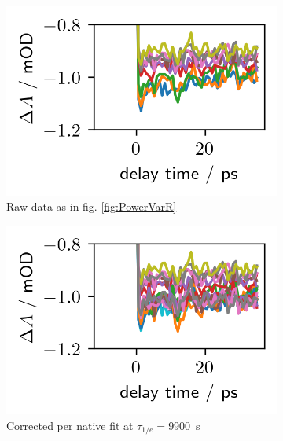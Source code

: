 \documentclass[twoside,openright,listof=numbered]{scrreprt}
\begin{document}
\begin{figure}[hbtp]
\centering
\begin{subfigure}[t]{0.3215\linewidth}
\centering
\includegraphics[width=\columnwidth]{images/PowerVarHigh_Raw.png}
\caption{Raw data as in fig. \ref{fig:PowerVarR}}
\end{subfigure}
\hfill
\begin{subfigure}[t]{0.3215\linewidth}
\centering
\includegraphics[width=\columnwidth]{images/PowerVarHigh_CorrNative9900.png} 
\caption{Corrected per native fit at $\tau_{1/e}=$\SI{9900}{\second}}
\end{subfigure}
\hfill
\begin{subfigure}[t]{0.3215\linewidth}
\centering

\end{subfigure}
\end{figure}
\end{document}
